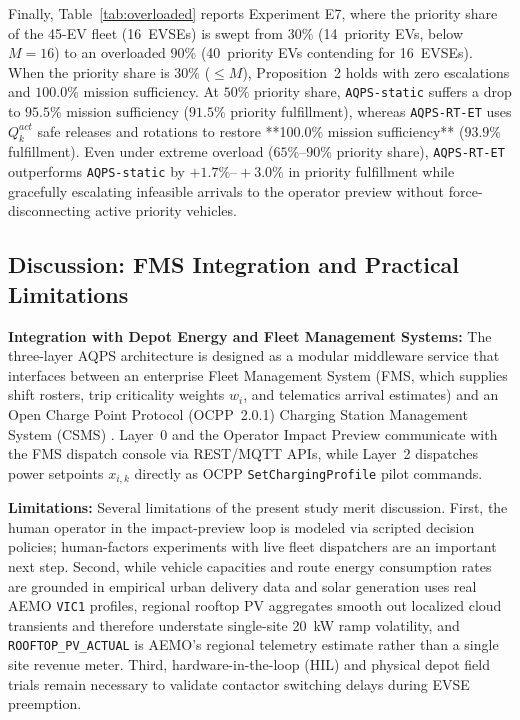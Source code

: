 \documentclass[final,3p,times,twocolumn]{elsarticle}
\begin{document}
Finally, Table~\ref{tab:overloaded} reports Experiment E7, where the priority share of the 45-EV fleet (16~EVSEs) is swept from $30\%$ (14~priority EVs, below $M=16$) to an overloaded $90\%$ (40~priority EVs contending for 16~EVSEs). When the priority share is $30\%$ ($\le M$), Proposition~2 holds with zero escalations and $100.0\%$ mission sufficiency. At $50\%$ priority share, \texttt{AQPS-static} suffers a drop to $95.5\%$ mission sufficiency ($91.5\%$ priority fulfillment), whereas \texttt{AQPS-RT-ET} uses $Q_k^{act}$ safe releases and rotations to restore **100.0\% mission sufficiency** ($93.9\%$ fulfillment). Even under extreme overload ($65\%\text{--}90\%$ priority share), \texttt{AQPS-RT-ET} outperforms \texttt{AQPS-static} by $+1.7\%\text{--}+3.0\%$ in priority fulfillment while gracefully escalating infeasible arrivals to the operator preview without force-disconnecting active priority vehicles.

\subsection{Discussion: FMS Integration and Practical Limitations}
\label{sec:discussion}

\textbf{Integration with Depot Energy and Fleet Management Systems:} The three-layer AQPS architecture is designed as a modular middleware service that interfaces between an enterprise Fleet Management System (FMS, which supplies shift rosters, trip criticality weights $w_i$, and telematics arrival estimates) and an Open Charge Point Protocol (OCPP~2.0.1) Charging Station Management System (CSMS) \cite{vales2026emergent}. Layer~0 and the Operator Impact Preview communicate with the FMS dispatch console via REST/MQTT APIs, while Layer~2 dispatches power setpoints $x_{i,k}$ directly as OCPP \texttt{SetChargingProfile} pilot commands.

\textbf{Limitations:} Several limitations of the present study merit discussion. First, the human operator in the impact-preview loop is modeled via scripted decision policies; human-factors experiments with live fleet dispatchers are an important next step. Second, while vehicle capacities and route energy consumption rates are grounded in empirical urban delivery data \cite{fiori2018modelling,vales2026emergent} and solar generation uses real AEMO \texttt{VIC1} profiles, regional rooftop PV aggregates smooth out localized cloud transients and therefore understate single-site 20~kW ramp volatility, and \texttt{ROOFTOP\_PV\_ACTUAL} is AEMO's regional telemetry estimate rather than a single site revenue meter. Third, hardware-in-the-loop (HIL) and physical depot field trials remain necessary to validate contactor switching delays during EVSE preemption.
\end{document}
